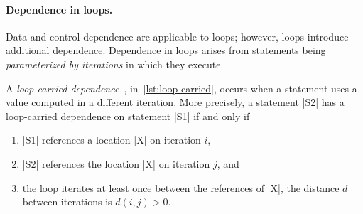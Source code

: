 \paragraph*{Dependence in loops.}
Data and control dependence are applicable to loops;
however, loops introduce additional dependence.
Dependence in loops arises from statements being \emph{parameterized by iterations} in which they execute.

A \emph{loop-carried dependence}~\cite[p. 73]{kennedy2001}, in~\autoref{lst:loop-carried},
occurs when a statement uses a value computed in a different iteration.
More precisely, a statement \pr|S2| has a loop-carried dependence on statement \pr|S1| if and only if
\begin{enumerate}
\item \pr|S1| references a location \pr|X| on iteration \(i\),
\item \pr|S2| references the location \pr|X| on iteration \(j\), and
\item the loop iterates at least once between the references of \pr|X|, \ie the distance \(d\) between iterations is \(d(i, j) > 0\).
\end{enumerate}

